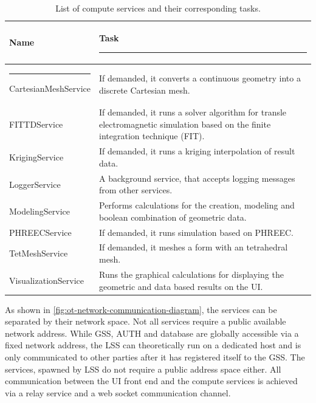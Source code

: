 \begin{table}[h!]
	\centering
	\begin{tabular}{|l | p{}|} 
		\hline
		Name & Task  \rule{-5pt}{2.6ex} \\
		\hline \rule{-3pt}{3ex}
		CartesianMeshService & If demanded, it converts a continuous geometry into a discrete Cartesian mesh. \\
		FITTDService & If demanded, it runs a solver algorithm for transle electromagnetic simulation based on the finite integration technique (FIT).\\
		KrigingService & If demanded, it runs a kriging interpolation of result data. \\ 
		LoggerService & A background service, that accepts logging messages from other services. \\ 
		ModelingService & Performs calculations for the creation, modeling and boolean combination of geometric data. \\ 
		PHREECService & If demanded, it runs simulation based on PHREEC. \\ 
		TetMeshService & If demanded, it meshes a form with an tetrahedral mesh.  \\ 
		VisualizationService & Runs the graphical calculations for displaying the geometric and data based results on the \ac{UI}.\\ 
		[1ex] 
		\hline
	\end{tabular}
	\caption{List of compute services and their corresponding tasks.}
	\label{tbl:ot-compute-services}
\end{table}


As shown in \autoref{fig:ot-network-communication-diagram}, the services can be separated by their network space. Not all services require a public available network address.
While \ac{GSS}, \ac{AUTH} and database are globally accessible via a fixed network address, the \ac{LSS} can theoretically run on a dedicated host and is only communicated to other parties after it has registered itself to the \ac{GSS}. The services, spawned by \ac{LSS} do not require a public address space either. All communication between the \ac{UI} front end and the compute services is achieved via a relay service and a web socket communication channel.


